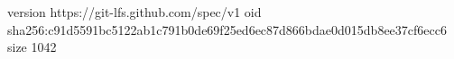 version https://git-lfs.github.com/spec/v1
oid sha256:c91d5591bc5122ab1c791b0de69f25ed6ec87d866bdae0d015db8ee37cf6ecc6
size 1042
